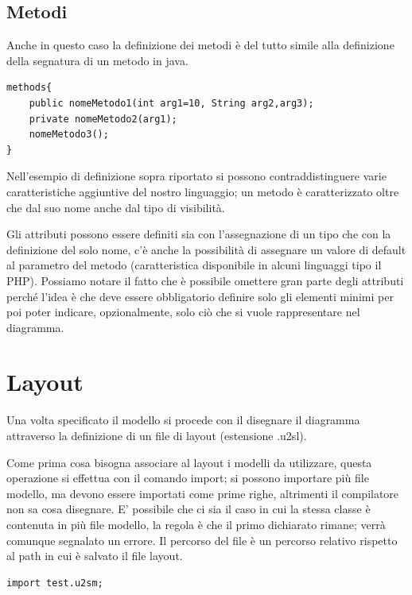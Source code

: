 \subsection{Metodi}

Anche in questo caso la definizione dei metodi è del tutto simile alla
definizione della segnatura di un metodo in java.

\begin{lstlisting}[caption={Dichiarazione di metodi}, style={model}]
methods{
	public nomeMetodo1(int arg1=10, String arg2,arg3);
	private nomeMetodo2(arg1);
	nomeMetodo3();
}
\end{lstlisting}

Nell'esempio di definizione sopra riportato si possono contraddistinguere varie 
caratteristiche aggiuntive del nostro linguaggio; un metodo è caratterizzato
oltre che dal suo nome anche dal tipo di visibilità.

Gli attributi possono essere definiti sia con l'assegnazione di un tipo che con
la definizione del solo nome, c'è anche la possibilità di assegnare un valore di
default al parametro del metodo (caratteristica disponibile in alcuni linguaggi
tipo il PHP).
Possiamo notare il fatto che è possibile omettere gran parte degli attributi
perché l'idea è che deve essere obbligatorio definire solo gli elementi minimi
per poi poter indicare, opzionalmente, solo ciò che si vuole rappresentare nel
diagramma. 


\section{Layout}


Una volta specificato il modello si procede con il disegnare il diagramma
attraverso la definizione di un file di layout (estensione .u2sl).

Come prima cosa bisogna associare al layout i modelli da utilizzare, questa
operazione si effettua con il comando import; si possono importare più file
modello, ma devono essere importati come prime righe, altrimenti il compilatore
non sa cosa disegnare. E' possibile che ci sia il caso in cui la stessa classe è
contenuta in più file modello, la regola è che il primo dichiarato rimane; verrà
comunque segnalato un errore. Il percorso del file è un percorso relativo
rispetto al path in cui è salvato il file layout.

\begin{lstlisting}[caption={Import dei modelli necessari}, style={layout}] 
import test.u2sm;
\end{lstlisting}

